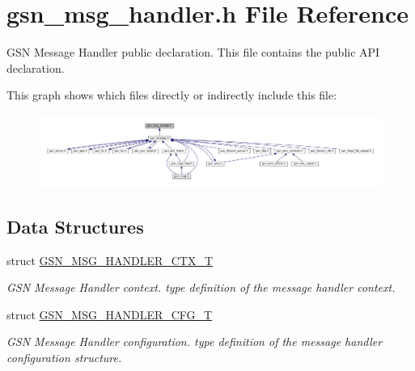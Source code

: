 \hypertarget{a00528}{
\section{gsn\_\-msg\_\-handler.h File Reference}
\label{a00528}
}


GSN Message Handler public declaration. This file contains the public API declaration.  


This graph shows which files directly or indirectly include this file:
\nopagebreak
\begin{figure}[H]
\begin{center}
\leavevmode
\includegraphics[width=400pt]{a00763}
\end{center}
\end{figure}
\subsection*{Data Structures}
\begin{DoxyCompactItemize}
\item 
struct \hyperlink{a00155}{GSN\_\-MSG\_\-HANDLER\_\-CTX\_\-T}
\begin{DoxyCompactList}\small\item\em GSN Message Handler context. type definition of the message handler context. \end{DoxyCompactList}\item 
struct \hyperlink{a00154}{GSN\_\-MSG\_\-HANDLER\_\-CFG\_\-T}
\begin{DoxyCompactList}\small\item\em GSN Message Handler configuration. type definition of the message handler configuration structure. \end{DoxyCompactList}\end{DoxyCompactItemize}
